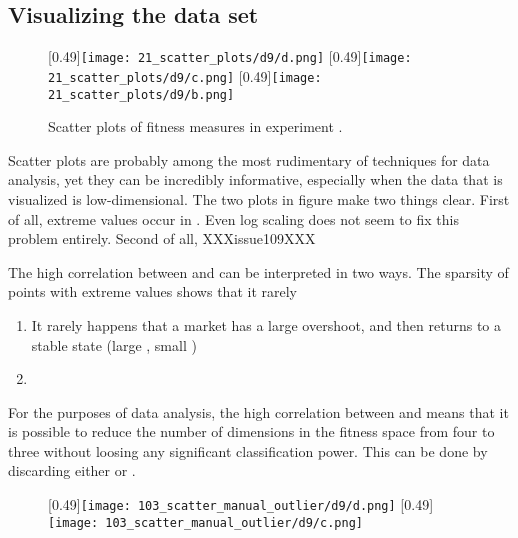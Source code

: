 \subsection{Visualizing the data set}
\begin{figure}
\centering
{}
[0.49\linewidth]{\texttt{[image: 21\_scatter\_plots/d9/d.png]}}
[0.49\linewidth]{\texttt{[image: 21\_scatter\_plots/d9/c.png]}}
[0.49\linewidth]{\texttt{[image: 21\_scatter\_plots/d9/b.png]}}
\caption{Scatter plots of fitness measures in experiment \dnine. }
\label{figure:scatter_log_transform}
\end{figure}

Scatter plots are probably among the most rudimentary of techniques for data analysis, yet they can be incredibly informative, especially when the data that is visualized is low-dimensional.
The two plots in figure make two things clear. First of all, extreme values occur in \stdev. Even log scaling does not seem to fix this problem entirely. Second of all, XXXissue109XXX

The high correlation between \stdev and \overshoot can be interpreted in two ways. 
The sparsity of points with extreme values shows that it rarely


\begin{enumerate}
\item It rarely happens that a market has a large overshoot, and then returns to a stable state (large \overshoot, small \stdev)
\item 
\end{enumerate}

For the purposes of data analysis, the high correlation between \stdev and \overshoot means that it is possible to reduce the number of dimensions in the fitness space from four to three without loosing any significant classification power. This can be done by discarding either \stdev or \overshoot. %


\begin{figure}
[0.49\linewidth]{\texttt{[image: 103\_scatter\_manual\_outlier/d9/d.png]}}
[0.49\linewidth]{\texttt{[image: 103\_scatter\_manual\_outlier/d9/c.png]}}
\caption{}
\label{fig:scatter_manual_outlier}
\end{figure}


